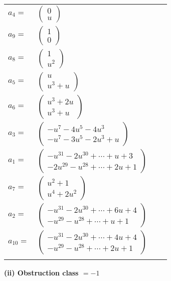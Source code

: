 \documentclass[1p]{elsarticle_modified}
\theoremstyle{definition}
\begin{document}
\begin{tabular}{m{7pt} m{180pt} m{7pt} m{180pt} }
\flushright $a_{4}=$&$\begin{pmatrix}0\\u\end{pmatrix}$ \\
\flushright $a_{9}=$&$\begin{pmatrix}1\\0\end{pmatrix}$ \\
\flushright $a_{8}=$&$\begin{pmatrix}1\\u^2\end{pmatrix}$ \\
\flushright $a_{5}=$&$\begin{pmatrix}u\\u^3+u\end{pmatrix}$ \\
\flushright $a_{6}=$&$\begin{pmatrix}u^3+2 u\\u^3+u\end{pmatrix}$ \\
\flushright $a_{3}=$&$\begin{pmatrix}- u^7-4 u^5-4 u^3\\- u^7-3 u^5-2 u^3+u\end{pmatrix}$ \\
\flushright $a_{1}=$&$\begin{pmatrix}- u^{31}-2 u^{30}+\cdots+u+3\\-2 u^{29}- u^{28}+\cdots+2 u+1\end{pmatrix}$ \\
\flushright $a_{7}=$&$\begin{pmatrix}u^2+1\\u^4+2 u^2\end{pmatrix}$ \\
\flushright $a_{2}=$&$\begin{pmatrix}- u^{31}-2 u^{30}+\cdots+6 u+4\\- u^{29}- u^{28}+\cdots+u+1\end{pmatrix}$ \\
\flushright $a_{10}=$&$\begin{pmatrix}- u^{31}-2 u^{30}+\cdots+4 u+4\\- u^{29}- u^{28}+\cdots+2 u+1\end{pmatrix}$\\&\end{tabular}
\flushleft \textbf{(ii) Obstruction class $= -1$}\\~\\
\end{document}
